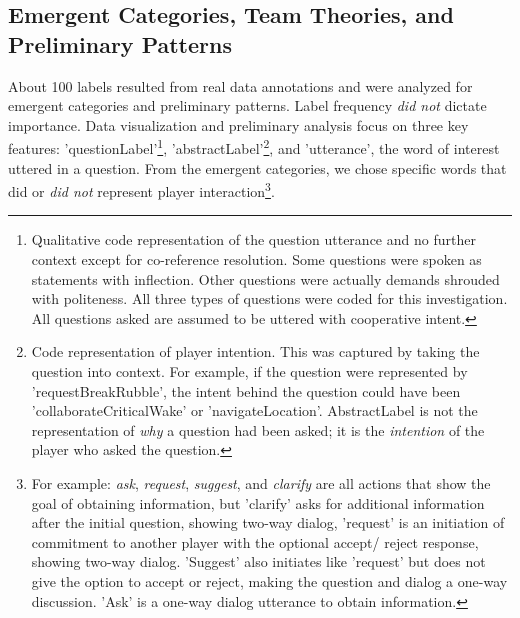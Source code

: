 \subsection{Emergent Categories, Team Theories, and Preliminary Patterns}

About 100 labels resulted from real data annotations and were analyzed for emergent categories and preliminary patterns. Label frequency \emph{did not} dictate importance. Data visualization and preliminary analysis focus on three key features: 'questionLabel'\footnote{Qualitative code representation of the question utterance and no further context except for co-reference resolution. Some questions were spoken as statements with inflection. Other questions were actually demands shrouded with politeness. All three types of questions were coded for this investigation. All questions asked are assumed to be uttered with cooperative intent.}, 'abstractLabel'\footnote{Code representation of player intention. This was captured by taking the question into context. For example, if the question were represented by 'requestBreakRubble', the intent behind the question could have been 'collaborateCriticalWake' or 'navigateLocation'. AbstractLabel is not the representation of \emph{why} a question had been asked; it is the \emph{intention} of the player who asked the question.}, and 'utterance', the word of interest uttered in a question. From the emergent categories, we chose specific words that did or \emph{did not} represent player interaction\footnote{For example: \emph{ask}, \emph{request}, \emph{suggest}, and \emph{clarify} are all actions that show the goal of obtaining information, but 'clarify' asks for additional information after the initial question, showing two-way dialog, 'request' is an initiation of commitment to another player with the optional accept/ reject response, showing two-way dialog. 'Suggest' also initiates like 'request' but does not give the option to accept or reject, making the question and dialog a one-way discussion. 'Ask' is a one-way dialog utterance to obtain information.}. 

